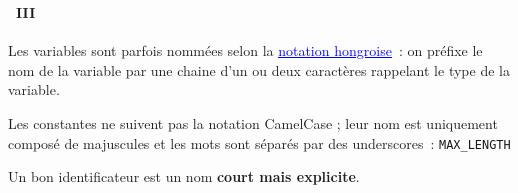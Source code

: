 \begin{frame}
  \frametitle{\secname}
  \framesubtitle{\subsecname~III}

  Les variables sont parfois nommées selon la \href{http://fr.wikipedia.org/wiki/Notation_hongroise}{\textcolor{blue}{\underline{notation hongroise}}}~: 
  on préfixe le nom de la variable par une chaine d'un ou deux caractères rappelant le type de la variable.
  \vspace{0.4cm}
  \par
  Les constantes ne suivent pas la notation CamelCase ; leur nom est uniquement composé de majuscules et les mots sont séparés par des underscores~: \texttt{MAX\_LENGTH}
  \vspace{0.4cm}
  \par
  Un bon identificateur est un nom \textbf{court mais explicite}.
\end{frame}

